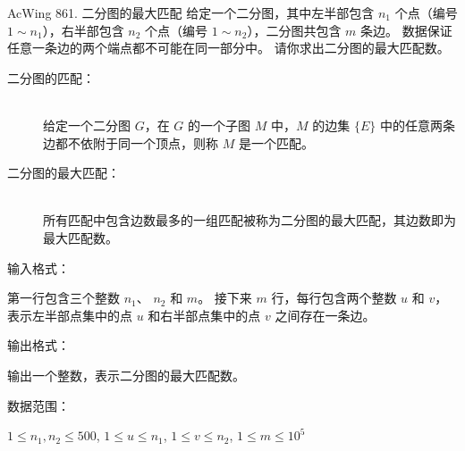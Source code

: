 \begin{titledbox}{AcWing 861. 二分图的最大匹配}
    给定一个二分图，其中左半部包含 $n_1$ 个点（编号 $1 \sim n_1$），右半部包含 $n_2$ 个点（编号 $1 \sim n_2$），二分图共包含 $m$ 条边。 数据保证任意一条边的两个端点都不可能在同一部分中。 请你求出二分图的最大匹配数。

    \begin{description}
        \item [二分图的匹配：] \\
        给定一个二分图 $G$，在 $G$ 的一个子图 $M$ 中，$M$ 的边集 $\{E\}$ 中的任意两条边都不依附于同一个顶点，则称 $M$ 是一个匹配。
        \item [二分图的最大匹配：] \\
        所有匹配中包含边数最多的一组匹配被称为二分图的最大匹配，其边数即为最大匹配数。
    \end{description}

    输入格式：

    第一行包含三个整数 $n_1$、 $n_2$ 和 $m$。 接下来 $m$ 行，每行包含两个整数 $u$ 和 $v$，表示左半部点集中的点 $u$ 和右半部点集中的点 $v$ 之间存在一条边。

    输出格式：

    输出一个整数，表示二分图的最大匹配数。

    数据范围：

    $1 \le n_1,n_2 \le 500$, $1 \le u \le n_1$, $1 \le v \le n_2$, $1 \le m \le 10^5$

    \begin{inputblock}
         \\
         \\
         \\
         \\
    \end{inputblock}
    \begin{outputblock}
    \end{outputblock}
\end{titledbox}
